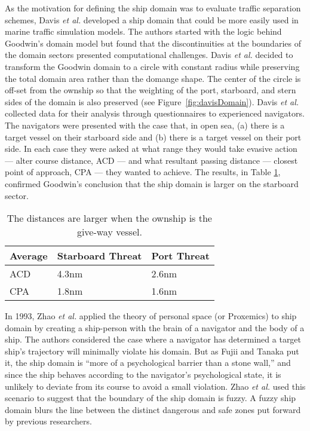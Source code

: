 \documentclass[twoside,symmetric,notoc]{tufte-book}
\newcommand{\etal}{\textit{et al.}\xspace}
\begin{document}
\par{%
As the motivation for defining the ship domain was to evaluate traffic separation schemes, Davis \etal\cite[.35in]{Davis} developed a ship domain that could be more easily used in marine traffic simulation models. The authors started with the logic behind Goodwin's domain model but found that the discontinuities at the boundaries of the domain sectors presented computational challenges. Davis \etal decided to transform the Goodwin domain to a circle with constant radius while preserving the total domain area rather than the domange shape. The center of the circle is off-set from the ownship so that the weighting of the port, starboard, and stern sides of the domain is also preserved (see Figure~\ref{fig:davisDomain}). Davis \etal collected data for their analysis through questionnaires to experienced navigators. The navigators were presented with the case that, in open sea, (a) there is a target vessel on their starboard side and (b) there is a target vessel on their port side. In each case they were asked at what range they would take evasive action --- alter course distance, ACD --- and what resultant passing distance --- closest point of approach, CPA --- they wanted to achieve. The results, in Table \ref{tab:acd}, confirmed Goodwin's conclusion that the ship domain is larger on the starboard sector.
\begin{table}[h]
    \centering
    \begin{tabular}{l|l l }
     Average    & Starboard Threat  & Port Threat\\
     \hline
     ACD	    & 4.3nm             & 2.6nm      \\
     CPA	    & 1.8nm             & 1.6nm      \\
     \hline
    \end{tabular}
    \vspace{.1in}
    \caption{The distances are larger when the ownship is the give-way vessel.}
    \label{tab:acd}
\end{table}
}
\par{%
In 1993, Zhao \etal\cite{Zhao_etal} applied the theory of personal space (or Proxemics) to ship domain by creating a ship-person with the brain of a navigator and the body of a ship. The authors considered the case where a navigator has determined a target ship's trajectory will minimally violate his domain. But as Fujii and Tanaka put it, the ship domain is ``more of a psychological barrier than a stone wall,'' and since the ship behaves according to the navigator's psychological state, it is unlikely to deviate from its course to avoid a small violation. Zhao \etal used this scenario to suggest that the boundary of the ship domain is fuzzy. A fuzzy ship domain blurs the line between the distinct dangerous and safe zones put forward by previous researchers.
}
\end{document}
